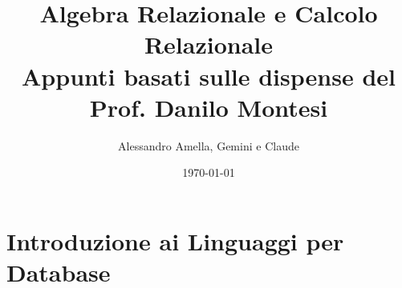 

\usepackage{hyperref}


\newcommand{\Rel}[1]{\textit{#1}} %
\newcommand{\Attr}[1]{\textsf{#1}} %

\newcommand{\myunion}{\cup}
\newcommand{\myintersection}{\cap}
\newcommand{\mydifference}{-}
\newcommand{\myrename}[2]{\rho_{#1}(#2)}
\newcommand{\myselectop}[2]{\sigma_{#1}(#2)}
\newcommand{\myproject}[2]{\pi_{#1}(#2)}
\newcommand{\mycartesian}{\times}
\newcommand{\mynaturaljoin}{\bowtie} %
\newcommand{\mythetajoin}[3]{#1 \bowtie_{#2} #3} %

\newcommand{\mylandop}{\wedge}
\newcommand{\myvel}{\vee}
\newcommand{\mynegop}{\neg}
\newcommand{\myforallop}{\forall}
\newcommand{\myexistsop}{\exists}

\def\ojoin{\setbox0=\hbox{$\mynaturaljoin$}%
	\rule[-.02ex]{.25em}{.4pt}\llap{\rule[\ht0]{.25em}{.4pt}}}
\newcommand{\myleftouterjoin}{\mathbin{\ojoin\mkern-5.8mu\mynaturaljoin}}
\newcommand{\myrightouterjoin}{\mathbin{\mynaturaljoin\mkern-5.8mu\ojoin}}
\newcommand{\myfullouterjoin}{\mathbin{\ojoin\mkern-5.8mu\mynaturaljoin\mkern-5.8mu\ojoin}}


\title{Algebra Relazionale e Calcolo Relazionale\\
  \large Appunti basati sulle dispense del Prof. Danilo Montesi}
\author{Alessandro Amella, Gemini e Claude}
\date{\today}


	
	\maketitle
	\tableofcontents
	\newpage
	
	\section{Introduzione ai Linguaggi per Database}
	
